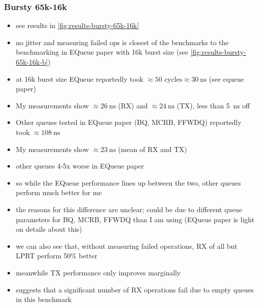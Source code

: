 \subsubsection{Bursty 65k-16k}
\begin{itemize}
    \item see results in \autoref{fig:results-bursty-65k-16k}
    \item no jitter and measuring failed ops is closest of the benchmarks to the benchmarking in EQueue paper
        with 16k burst size (see \autoref{fig:results-bursty-65k-16k-b})
    \item at 16k burst size EQueue reportedly took $\approx 50\text{ cycles} \approx \SI{30}{\nano\second}$
        (see equeue paper)
    \item My measurements show $\approx \SI{26}{\nano\second}$ (RX) and $\approx \SI{24}{\nano\second}$ (TX),
        less than \SI{5}{\nano\second} off
    \item Other queues tested in EQueue paper (BQ, MCRB, FFWDQ) reportedly took $\approx \SI{108}{\nano\second}$
    \item My measurements show $\approx \SI{23}{\nano\second}$ (mean of RX and TX)
    \item other queues 4-5x worse in EQueue paper
    \item so while the EQueue performance lines up between the two, other queues perform much better for me
    \item the reasons for this difference are unclear; could be due to different queue parameters for BQ, MCRB, FFWDQ than I am using (EQueue paper is light on details about this)
    \item we can also see that, without measuring failed operations, RX of all but LPRT perform 50\% better
    \item meanwhile TX performance only improves marginally
    \item suggests that a significant number of RX operations fail due to empty queues in this benchmark
\end{itemize}

